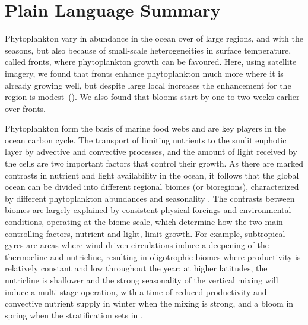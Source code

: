 \section*{Plain Language Summary}
Phytoplankton vary in abundance in the ocean over of large regions, and with the seasons, but also because of small-scale heterogeneities in surface temperature, called fronts, where phytoplankton growth can be favoured.
Here, using satellite imagery, we found that fronts enhance phytoplankton much more where it is already growing well, but despite large local increases the  enhancement for the region is modest~(). We also found that blooms start by one to two weeks earlier over fronts.


\introduction{}

Phytoplankton form the basis of marine food webs and are key players in the ocean carbon cycle.
The transport of limiting nutrients to the sunlit euphotic layer by advective and convective processes, and the amount of light received by the cells  are two important factors that control their growth.
As there are marked contrasts in nutrient and light availability in the ocean, it follows that the global ocean can be divided into different regional biomes (or bioregions), characterized by different phytoplankton abundances and seasonality \parencite{longhurst_2007, vichi_2011a, bock_2022}.
The contrasts between biomes are largely explained by consistent physical forcings and environmental conditions, operating at the biome scale, which determine how the two main controlling factors, nutrient and light, limit growth.
For example, subtropical gyres are areas where wind-driven circulations induce a deepening of the thermocline and nutricline, resulting in oligotrophic biomes where productivity is relatively constant and low throughout the year; at higher latitudes, the nutricline is shallower and the strong seasonality of the vertical mixing will induce a multi-stage operation, with a time of reduced productivity and convective nutrient supply in winter when the mixing is strong, and a bloom in spring when the stratification sets in \parencite{wilson_2005, williams_2011}.


